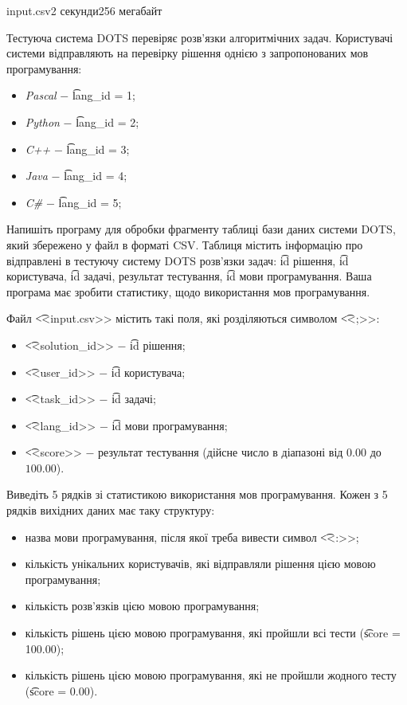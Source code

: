 \begin{problem}{}{input.csv}{}{2 секунди}{256 мегабайт}

Тестуюча система DOTS перевіряє розв'язки алгоритмічних задач.
Користувачі системи відправляють на перевірку рішення однією з запропонованих мов програмування:
\begin{itemize}
 \setlength\itemsep{0em}
 \item \textit{Pascal} $-$ \t{lang\_id = 1};
 \item \textit{Python} $-$ \t{lang\_id = 2};
 \item \textit{C++} $-$ \t{lang\_id = 3};
 \item \textit{Java} $-$ \t{lang\_id = 4};
 \item \textit{C\#} $-$ \t{lang\_id = 5};
\end{itemize}

Напишіть програму для обробки фрагменту таблиці бази даних системи DOTS, який збережено у файл в форматі CSV.
Таблиця містить інформацію про відправлені в тестуючу систему DOTS розв'язки задач: 
\t{id} рішення, \t{id} користувача, \t{id} задачі, результат тестування, \t{id} мови програмування.
Ваша програма має зробити статистику, щодо використання мов програмування. 

\InputFile
Файл \t{<<input.csv>>} містить такі поля, які розділяються символом \t{<<;>>}:
\begin{itemize}
  \setlength\itemsep{0em}
  \item \t{<<solution\_id>>} $-$ \t{id} рішення;
  \item \t{<<user\_id>>} $-$ \t{id} користувача;
  \item \t{<<task\_id>>} $-$ \t{id} задачі;
  \item \t{<<lang\_id>>} $-$ \t{id} мови програмування;
  \item \t{<<score>>} $-$ результат тестування (дійсне число в діапазоні від $0.00$ до $100.00$). 
\end{itemize}

\OutputFile
Виведіть 5 рядків зі статистикою використання мов програмування.
Кожен з 5 рядків вихідних даних має таку структуру: 
\begin{itemize}
  \setlength\itemsep{0em}
  \item назва мови програмування, після якої треба вивести символ \t{<<:>>};
  \item кількість унікальних користувачів, які відправляли рішення цією мовою програмування;
  \item кількість розв'язків цією мовою програмування;
  \item кількість рішень цією мовою програмування, які пройшли всі тести (\t{score = 100.00});
  \item кількість рішень цією мовою програмування, які не пройшли жодного тесту (\t{score = 0.00}).
\end{itemize}

\Example
\begin{example}
%
\end{example}

\end{problem}

